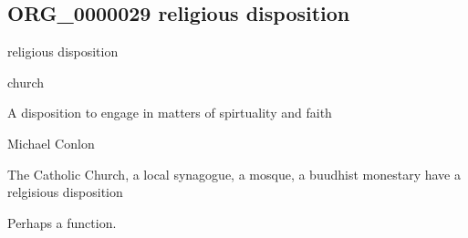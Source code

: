 \documentclass[letterpaper,10pt,english]{sphinxmanual}
\begin{document}
\subsection{ORG\_0000029 \sphinxhyphen{} religious disposition}
\label{\detokenize{doc-ORG_0000029:org-0000029-religious-disposition}}\label{\detokenize{doc-ORG_0000029:index-0}}\label{\detokenize{doc-ORG_0000029::doc}}
\begin{sphinxShadowBox}

\sphinxAtStartPar
religious disposition
\end{sphinxShadowBox}

\begin{sphinxShadowBox}

\sphinxAtStartPar
church
\end{sphinxShadowBox}

\begin{sphinxShadowBox}

\sphinxAtStartPar
{\hyperref[\detokenize{doc-BFO_0000016::doc}]{}}
\end{sphinxShadowBox}

\begin{sphinxShadowBox}

\sphinxAtStartPar
A disposition to engage in matters of spirtuality and faith
\end{sphinxShadowBox}

\begin{sphinxShadowBox}

\sphinxAtStartPar
Michael Conlon 
\end{sphinxShadowBox}

\begin{sphinxShadowBox}

\sphinxAtStartPar
The Catholic Church, a local synagogue, a mosque, a buudhist monestary have a relgisious disposition
\end{sphinxShadowBox}

\begin{sphinxShadowBox}

\sphinxAtStartPar
Perhaps a function.
\end{sphinxShadowBox}
\end{document}
